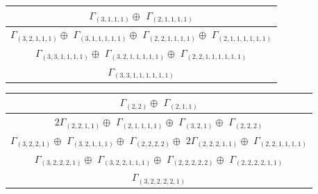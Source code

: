 \documentclass[main.tex]{subfiles}
\begin{document}
\bigskip
\begin{minipage}{1\textwidth}
\centering
\begin{tabular}{c}
$\Gamma_{(
3 , 
1 , 
1 , 
1
)} \oplus$
$\Gamma_{(
2 , 
1 , 
1 , 
1 , 
1
)}$
\\ \hline
$\Gamma_{(
3 , 
2 , 
1 , 
1 , 
1
)} \oplus$
$\Gamma_{(
3 , 
1 , 
1 , 
1 , 
1 , 
1
)} \oplus$
$\Gamma_{(
2 , 
2 , 
1 , 
1 , 
1 , 
1
)} \oplus$
$\Gamma_{(
2 , 
1 , 
1 , 
1 , 
1 , 
1 , 
1
)}$
\\ \hline
$\Gamma_{(
3 , 
3 , 
1 , 
1 , 
1 , 
1
)} \oplus$
$\Gamma_{(
3 , 
2 , 
1 , 
1 , 
1 , 
1 , 
1
)} \oplus$
$\Gamma_{(
2 , 
2 , 
1 , 
1 , 
1 , 
1 , 
1 , 
1
)}$
\\ \hline
$\Gamma_{(
3 , 
3 , 
1 , 
1 , 
1 , 
1 , 
1 , 
1
)}$
\\
\end{tabular}\end{minipage}
\bigskip
\begin{minipage}{1\textwidth}
\centering
\begin{tabular}{c}
$\Gamma_{(
2 , 
2
)} \oplus$
$\Gamma_{(
2 , 
1 , 
1
)}$
\\ \hline
$ 2 \Gamma_{(
2 , 
2 , 
1 , 
1
)} \oplus$
$\Gamma_{(
2 , 
1 , 
1 , 
1 , 
1
)} \oplus$
$\Gamma_{(
3 , 
2 , 
1
)} \oplus$
$\Gamma_{(
2 , 
2 , 
2
)}$
\\ \hline
$\Gamma_{(
3 , 
2 , 
2 , 
1
)} \oplus$
$\Gamma_{(
3 , 
2 , 
1 , 
1 , 
1
)} \oplus$
$\Gamma_{(
2 , 
2 , 
2 , 
2
)} \oplus$
$ 2 \Gamma_{(
2 , 
2 , 
2 , 
1 , 
1
)} \oplus$
$\Gamma_{(
2 , 
2 , 
1 , 
1 , 
1 , 
1
)}$
\\ \hline
$\Gamma_{(
3 , 
2 , 
2 , 
2 , 
1
)} \oplus$
$\Gamma_{(
3 , 
2 , 
2 , 
1 , 
1 , 
1
)} \oplus$
$\Gamma_{(
2 , 
2 , 
2 , 
2 , 
2
)} \oplus$
$\Gamma_{(
2 , 
2 , 
2 , 
2 , 
1 , 
1
)}$
\\ \hline
$\Gamma_{(
3 , 
2 , 
2 , 
2 , 
2 , 
1
)}$
\\
\end{tabular}\end{minipage}
\bigskip
\end{document}
